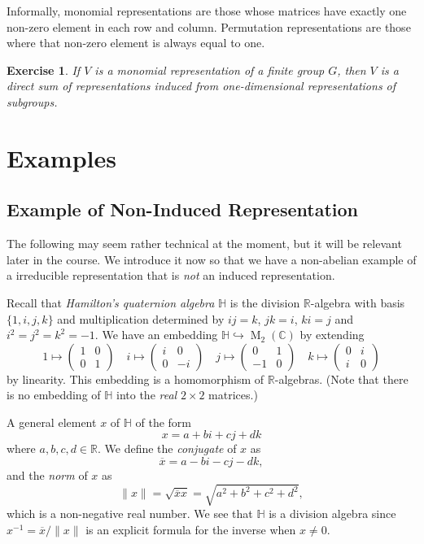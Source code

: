 \documentclass[12pt]{article}
\theoremstyle{plain}
\newtheorem{exercise}[theorem]{Exercise}
\theoremstyle{definition}
\theoremstyle{remark}
\numberwithin{equation}{section}
\begin{document}
Informally, monomial representations are those whose matrices have
exactly one non-zero element in each row and column.
Permutation representations are those where that non-zero element is
always equal to one.

\begin{exercise}
If $V$ is a monomial representation of a finite group $G$,
then $V$ is a direct sum of representations induced from one-dimensional
representations of subgroups.
\end{exercise}

\section{Examples}

\subsection{Example of Non-Induced Representation}

The following may seem rather technical at the moment, but it will be
relevant later in the course.  We introduce it now so that we have a
non-abelian example of a irreducible representation that is
\emph{not} an induced representation.

Recall that \emph{Hamilton's quaternion algebra} $\mathbb{H}$
is the division $\mathbb{R}$-algebra
with basis $\{1,i,j,k\}$ and multiplication determined by
$ij=k$, $jk=i$, $ki=j$ and $i^2=j^2=k^2=-1$.
We have an embedding
$\mathbb{H} \hookrightarrow \operatorname{M}_2(\mathbb{C})$
by extending
\[
1 \mapsto \begin{pmatrix} 1&0\\0&1 \end{pmatrix} \quad
i \mapsto \begin{pmatrix} i&0\\0&-i \end{pmatrix} \quad
j \mapsto \begin{pmatrix} 0&1\\-1&0 \end{pmatrix} \quad
k \mapsto \begin{pmatrix} 0&i\\i&0 \end{pmatrix}
\]
by linearity.
This embedding is a homomorphism of $\mathbb{R}$-algebras.
(Note that there is no embedding of $\mathbb{H}$ into
the \emph{real} $2\times 2$ matrices.)

A general element $x$ of $\mathbb{H}$ of the form
\[
x = a + bi + cj + dk
\]
where $a,b,c,d \in \mathbb{R}$.
We define the \emph{conjugate} of $x$ as
\[
\overline{x} = a -bi-cj-dk,
\]
and the \emph{norm} of $x$ as
\[
\|x\| = \sqrt{\overline{x} x} = \sqrt{a^2+b^2+c^2+d^2},
\]
which is a non-negative real number.
We see that $\mathbb{H}$ is a division algebra
since $x^{-1} = \overline{x}/\|x\|$ is an explicit formula for the
inverse when $x \ne 0$.
\end{document}
